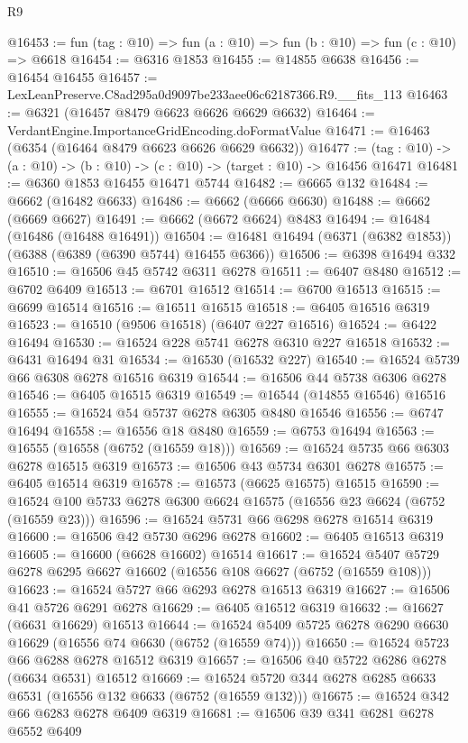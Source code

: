 \begin{lexlean}{R9}
\begin{coremodule}
@16453 := fun (tag : @10) => fun (a : @10) => fun (b : @10) => fun (c : @10) => @6618
@16454 := @6316 @1853
@16455 := @14855 @6638
@16456 := @16454 @16455
@16457 := LexLeanPreserve.C8ad295a0d9097be233aee06c62187366.R9.__fits_113
@16463 := @6321 (@16457 @8479 @6623 @6626 @6629 @6632)
@16464 := VerdantEngine.ImportanceGridEncoding.doFormatValue
@16471 := @16463 (@6354 (@16464 @8479 @6623 @6626 @6629 @6632))
@16477 := (tag : @10) -> (a : @10) -> (b : @10) -> (c : @10) -> (target : @10) -> @16456 @16471
@16481 := @6360 @1853 @16455 @16471 @5744
@16482 := @6665 @132
@16484 := @6662 (@16482 @6633)
@16486 := @6662 (@6666 @6630)
@16488 := @6662 (@6669 @6627)
@16491 := @6662 (@6672 @6624) @8483
@16494 := @16484 (@16486 (@16488 @16491))
@16504 := @16481 @16494 (@6371 (@6382 @1853)) (@6388 (@6389 (@6390 @5744) @16455 @6366))
@16506 := @6398 @16494 @332
@16510 := @16506 @45 @5742 @6311 @6278
@16511 := @6407 @8480
@16512 := @6702 @6409
@16513 := @6701 @16512
@16514 := @6700 @16513
@16515 := @6699 @16514
@16516 := @16511 @16515
@16518 := @6405 @16516 @6319
@16523 := @16510 (@9506 @16518) (@6407 @227 @16516)
@16524 := @6422 @16494
@16530 := @16524 @228 @5741 @6278 @6310 @227 @16518
@16532 := @6431 @16494 @31
@16534 := @16530 (@16532 @227)
@16540 := @16524 @5739 @66 @6308 @6278 @16516 @6319
@16544 := @16506 @44 @5738 @6306 @6278
@16546 := @6405 @16515 @6319
@16549 := @16544 (@14855 @16546) @16516
@16555 := @16524 @54 @5737 @6278 @6305 @8480 @16546
@16556 := @6747 @16494
@16558 := @16556 @18 @8480
@16559 := @6753 @16494
@16563 := @16555 (@16558 (@6752 (@16559 @18)))
@16569 := @16524 @5735 @66 @6303 @6278 @16515 @6319
@16573 := @16506 @43 @5734 @6301 @6278
@16575 := @6405 @16514 @6319
@16578 := @16573 (@6625 @16575) @16515
@16590 := @16524 @100 @5733 @6278 @6300 @6624 @16575 (@16556 @23 @6624 (@6752 (@16559 @23)))
@16596 := @16524 @5731 @66 @6298 @6278 @16514 @6319
@16600 := @16506 @42 @5730 @6296 @6278
@16602 := @6405 @16513 @6319
@16605 := @16600 (@6628 @16602) @16514
@16617 := @16524 @5407 @5729 @6278 @6295 @6627 @16602 (@16556 @108 @6627 (@6752 (@16559 @108)))
@16623 := @16524 @5727 @66 @6293 @6278 @16513 @6319
@16627 := @16506 @41 @5726 @6291 @6278
@16629 := @6405 @16512 @6319
@16632 := @16627 (@6631 @16629) @16513
@16644 := @16524 @5409 @5725 @6278 @6290 @6630 @16629 (@16556 @74 @6630 (@6752 (@16559 @74)))
@16650 := @16524 @5723 @66 @6288 @6278 @16512 @6319
@16657 := @16506 @40 @5722 @6286 @6278 (@6634 @6531) @16512
@16669 := @16524 @5720 @344 @6278 @6285 @6633 @6531 (@16556 @132 @6633 (@6752 (@16559 @132)))
@16675 := @16524 @342 @66 @6283 @6278 @6409 @6319
@16681 := @16506 @39 @341 @6281 @6278 @6552 @6409

\end{coremodule}
\end{lexlean}
